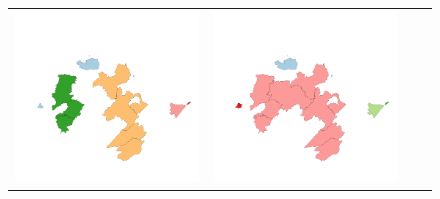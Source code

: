 \begin{figure}
\begin{tabularx}{1\textwidth}{XXXX}
\includegraphics[width=1\linewidth]{images/ch6/contig/07}&
\includegraphics[width=1\linewidth]{images/ch6/contig/08} \\

\end{tabularx}
\end{figure}
